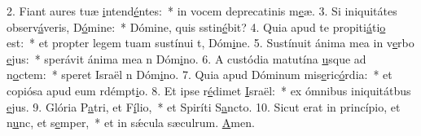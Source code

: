 2. Fiant aures tuæ \uline{i}ntend\uline{é}ntes:~* in vocem deprecatinis m\uline{e}æ.
3. Si iniquitátes observ\uline{á}veris, D\uline{ó}mine:~* Dómine, quis sstin\uline{é}bit?
4. Quia apud te propiti\uline{á}ti\uline{o} est:~* et propter legem tuam sustínui t, Dóm\uline{i}ne.
5. Sustínuit ánima mea in v\uline{e}rbo \uline{e}jus:~* sperávit ánima mea n Dóm\uline{i}no.
6. A custódia matutína \uline{u}sque ad n\uline{o}ctem:~* speret Israël n Dóm\uline{i}no.
7. Quia apud Dóminum mis\uline{e}ric\uline{ó}rdia:~* et copiósa apud eum rdémpt\uline{i}o.
8. Et ipse r\uline{é}dimet \uline{I}sraël:~* ex ómnibus iniquitátbus \uline{e}jus.
9. Glória P\uline{a}tri, et F\uline{í}lio,~* et Spiríti S\uline{a}ncto.
10. Sicut erat in princípio, et n\uline{u}nc, et s\uline{e}mper,~* et in sǽcula sæculrum. \uline{A}men.
